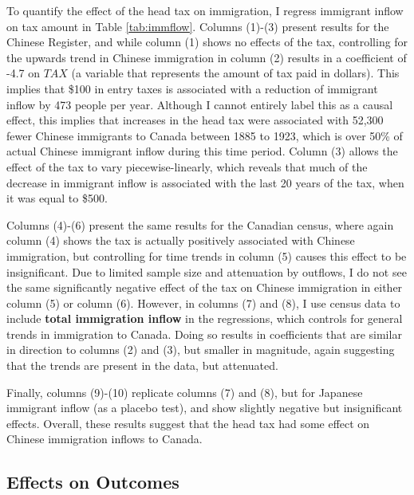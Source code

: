 \documentclass[12pt]{article}
\begin{document}
To quantify the effect of the head tax on immigration, I regress immigrant inflow on tax amount in Table \ref{tab:immflow}. Columns (1)-(3) present results for the Chinese Register, and while column (1) shows no effects of the tax, controlling for the upwards trend in Chinese immigration in column (2) results in a coefficient of -4.7 on $TAX$ (a variable that represents the amount of tax paid in dollars). This implies that \$100 in entry taxes is associated with a reduction of immigrant inflow by 473 people per year. Although I cannot entirely label this as a causal effect, this implies that increases in the head tax were associated with 52,300 fewer Chinese immigrants to Canada between 1885 to 1923, which is over 50\% of actual Chinese immigrant inflow during this time period. Column (3) allows the effect of the tax to vary piecewise-linearly, which reveals that much of the decrease in immigrant inflow is associated with the last 20 years of the tax, when it was equal to \$500. 

Columns (4)-(6) present the same results for the Canadian census, where again column (4) shows the tax is actually positively associated with Chinese immigration, but controlling for time trends in column (5) causes this effect to be insignificant. Due to limited sample size and attenuation by outflows, I do not see the same significantly negative effect of the tax on Chinese immigration in either column (5) or column (6). However, in columns (7) and (8), I use census data to include \textbf{total immigration inflow} in the regressions, which controls for general trends in immigration to Canada. Doing so results in coefficients that are similar in direction to columns (2) and (3), but smaller in magnitude, again suggesting that the trends are present in the data, but attenuated. 

Finally, columns (9)-(10) replicate columns (7) and (8), but for Japanese immigrant inflow (as a placebo test), and show slightly negative but insignificant effects. Overall, these results suggest that the head tax had some effect on Chinese immigration inflows to Canada.


\subsection{Effects on Outcomes}
\end{document}
